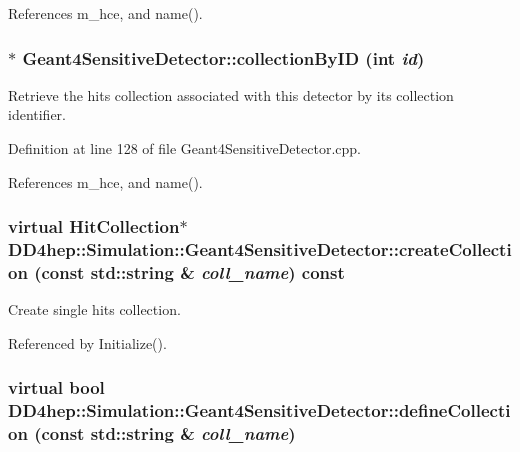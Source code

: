 References m\_\-hce, and name().\hypertarget{class_d_d4hep_1_1_simulation_1_1_geant4_sensitive_detector_a45d013173dd5a1b159e2bb2bfca12d56}{
\subsubsection[{collectionByID}]{ $\ast$ Geant4SensitiveDetector::collectionByID (int {\em id})}}
\label{class_d_d4hep_1_1_simulation_1_1_geant4_sensitive_detector_a45d013173dd5a1b159e2bb2bfca12d56}


Retrieve the hits collection associated with this detector by its collection identifier. 

Definition at line 128 of file Geant4SensitiveDetector.cpp.

References m\_\-hce, and name().\hypertarget{class_d_d4hep_1_1_simulation_1_1_geant4_sensitive_detector_ab787fe98fb6da409b9f342b9a20906f1}{
\subsubsection[{createCollection}]{\setlength{\rightskip}{0pt plus 5cm}virtual {\bf HitCollection}$\ast$ DD4hep::Simulation::Geant4SensitiveDetector::createCollection (const std::string \& {\em coll\_\-name}) const}}
\label{class_d_d4hep_1_1_simulation_1_1_geant4_sensitive_detector_ab787fe98fb6da409b9f342b9a20906f1}


Create single hits collection. 

Referenced by Initialize().\hypertarget{class_d_d4hep_1_1_simulation_1_1_geant4_sensitive_detector_ad66e6523db65dab402beb511e438c2c9}{
\subsubsection[{defineCollection}]{\setlength{\rightskip}{0pt plus 5cm}virtual bool DD4hep::Simulation::Geant4SensitiveDetector::defineCollection (const std::string \& {\em coll\_\-name})}}
\label{class_d_d4hep_1_1_simulation_1_1_geant4_sensitive_detector_ad66e6523db65dab402beb511e438c2c9}



